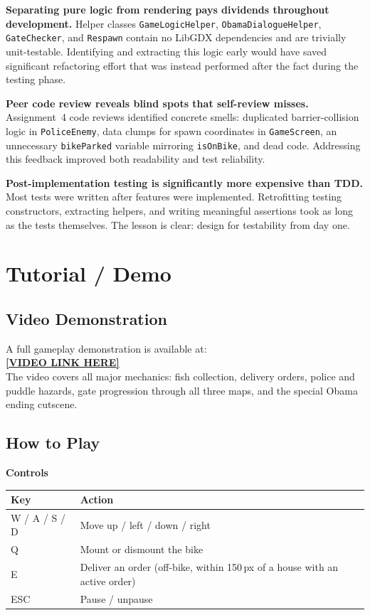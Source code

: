 \documentclass[12pt]{article}
\begin{document}
\textbf{Separating pure logic from rendering pays dividends throughout development.}
Helper classes \texttt{GameLogicHelper}, \texttt{ObamaDialogueHelper}, \texttt{GateChecker}, and \texttt{Respawn} contain no LibGDX dependencies and are trivially unit-testable. Identifying and extracting this logic early would have saved significant refactoring effort that was instead performed after the fact during the testing phase.

\textbf{Peer code review reveals blind spots that self-review misses.}
Assignment~4 code reviews identified concrete smells: duplicated barrier-collision logic in \texttt{PoliceEnemy}, data clumps for spawn coordinates in \texttt{GameScreen}, an unnecessary \texttt{bikeParked} variable mirroring \texttt{isOnBike}, and dead code. Addressing this feedback improved both readability and test reliability.

\textbf{Post-implementation testing is significantly more expensive than TDD.}
Most tests were written after features were implemented. Retrofitting testing constructors, extracting helpers, and writing meaningful assertions took as long as the tests themselves. The lesson is clear: design for testability from day one.

\section{Tutorial / Demo}

\subsection{Video Demonstration}

A full gameplay demonstration is available at:\\
\textbf{\url{[VIDEO LINK HERE]}}\\
The video covers all major mechanics: fish collection, delivery orders, police and puddle hazards, gate progression through all three maps, and the special Obama ending cutscene.

\subsection{How to Play}

\textbf{Controls}

\begin{center}
\begin{tabular}{ll}
\toprule
\textbf{Key} & \textbf{Action} \\
\midrule
W / A / S / D & Move up / left / down / right \\
Q             & Mount or dismount the bike \\
E             & Deliver an order (off-bike, within 150\,px of a house with an active order) \\
ESC           & Pause / unpause \\
\bottomrule
\end{tabular}
\end{center}
\end{document}

